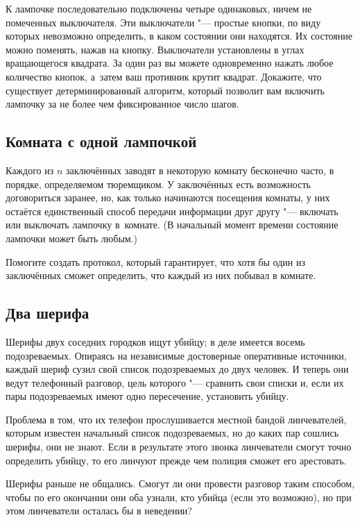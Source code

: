 \documentclass[twoside]{book}
\makeatletter
\newcommand{\rindex}[2][\imki@jobname]{%
\index[#1]{\detokenize{#2}}%
}
\makeatother
\begin{document}
К лампочке последовательно подключены четыре одинаковых, ничем не
помеченных выключателя.
Эти выключатели "--- простые кнопки, по виду
которых невозможно определить, в каком состоянии они находятся.
Их
состояние можно поменять, нажав на кнопку.
Выключатели установлены в
углах вращающегося квадрата.
За один раз вы можете одновременно
нажать любое количество кнопок, а~затем ваш противник крутит квадрат.
Докажите, что существует детерминированный алгоритм, который позволит
вам включить лампочку за не более чем фиксированное число шагов.

\subsection*{Комната с одной лампочкой}%
\rindex{Комната с одной лампочкой}

Каждого из $n$ заключённых заводят в некоторую комнату бесконечно
часто, в порядке, определяемом тюремщиком.
У заключённых есть
возможность договориться заранее, но, как только начинаются посещения
комнаты, у них остаётся единственный способ передачи информации друг
другу "--- включать или выключать лампочку в~комнате.
(В начальный
момент времени состояние лампочки может быть любым.)

Помогите создать протокол, который гарантирует, что хотя бы один из
заключённых сможет определить, что каждый из них побывал в комнате.

\subsection*{Два шерифа}%
\rindex{Два шерифа}

Шерифы двух соседних городков ищут убийцу; в деле имеется восемь
подозреваемых.
Опираясь на независимые достоверные оперативные
источники, каждый шериф сузил свой список подозреваемых до двух
человек.
И теперь они ведут телефонный разговор, цель которого "---
сравнить свои списки и, если их пары подозреваемых имеют одно
пересечение, установить убийцу.

Проблема в том, что их телефон прослушивается местной бандой
линчевателей, которым известен начальный список подозреваемых, но до
каких пар сошлись шерифы, они не знают.
Если в результате этого
звонка линчеватели смогут точно определить убийцу, то его линчуют
прежде чем полиция сможет его арестовать.

Шерифы раньше не общались. Смогут ли они провести разговор таким
способом, чтобы по его окончании они оба узнали, кто убийца (если это
возможно), но при этом линчеватели осталась бы в неведении?
\end{document}
